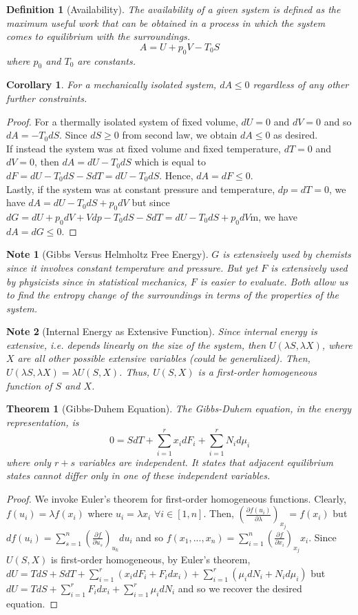 \documentclass[a4paper]{article}
\newtheorem{defi}{Definition}[section]
\newtheorem{thm}{Theorem}[section]
\newtheorem{cor}{Corollary}[section]
\theoremstyle{new}
\newtheorem{Note}{Note}[section]
\begin{document}
\begin{defi}[Availability]
The availability of a given system is defined as the maximum useful work that can be obtained in a process in which the system comes to equilibrium with the surroundings. 
$$A=U+p_0V-T_0S$$
where $p_0$ and $T_0$ are constants.
\end{defi}
\begin{cor}
For a mechanically isolated system, $dA\leq 0$ regardless of any other further constraints. 
\end{cor}
\begin{proof}
For a thermally isolated system of fixed volume, $dU=0$ and $dV=0$ and so $dA=-T_0dS$. Since $dS\geq0$ from second law, we obtain $dA\leq 0$ as desired.\\[5pt]
If instead the system was at fixed volume and fixed temperature, $dT=0$ and $dV=0$, then $dA=dU-T_0dS$ which is equal to $dF=dU-T_0dS-SdT=dU-T_0dS$. Hence, $dA=dF\leq0$.\\[5pt]
Lastly, if the system was at constant pressure and temperature, $dp=dT=0$, we have $dA=dU-T_0dS+p_0dV$ but since $dG=dU+p_0dV+Vdp-T_0dS-SdT=dU-T_0dS+p_0dV$m, we have $dA=dG\leq 0$.
\end{proof}
\begin{Note}[Gibbs Versus Helmholtz Free Energy]
$G$ is extensively used by chemists since it involves constant temperature and pressure. But yet $F$ is extensively used by physicists since in statistical mechanics, $F$ is easier to evaluate. Both allow us to find the entropy change of the surroundings in terms of the properties of the system.
\end{Note}
\begin{Note}[Internal Energy as Extensive Function]
Since internal energy is extensive, i.e. depends linearly on the size of the system, then $U(\lambda S, \lambda X)$, where $X$ are all other possible extensive variables (could be generalized). Then, $U(\lambda S,\lambda X)=\lambda U(S,X)$. Thus, $U(S,X)$ is a first-order homogeneous function of $S$ and $X$.
\end{Note}
\begin{thm}[Gibbs-Duhem Equation]
The Gibbs-Duhem equation, in the energy representation, is
$$0=SdT+\sum_{i=1}^rx_idF_i+\sum_{i=1}^rN_id\mu_i$$
where only $r+s$ variables are independent. It states that adjacent equilibrium states cannot differ only in one of these independent variables.
\end{thm}
\begin{proof}
We invoke Euler's theorem for first-order homogeneous functions. Clearly, $f(u_i)=\lambda f(x_i)$ where $u_i=\lambda x_i$ $\forall i\in[1,n]$. Then, $(\frac{\partial f(u_i)}{\partial \lambda})_{x_j}=f(x_i)$ but $df(u_i)=\sum_{s=1}^n(\frac{\partial f}{\partial u_s})_{u_k}du_i$ and so $f(x_1,...,x_n)=\sum_{i=1}^n(\frac{\partial f}{\partial x_i})_{x_j}x_i$. Since $U(S,X)$ is first-order homogeneous, by Euler's theorem, $dU=TdS+SdT+\sum_{i=1}^r(x_idF_i+F_idx_i)+\sum_{i=1}^r(\mu_idN_i+N_id\mu_i)$ but $dU=TdS+\sum_{i=1}^rF_idx_i+\sum_{i=1}^r\mu_idN_i$ and so we recover the desired equation.
\end{proof}
\end{document}
